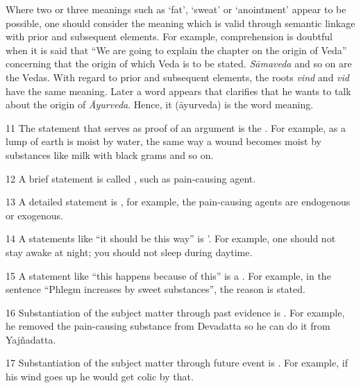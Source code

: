 \begin{translation}
   Where two or three meanings such as `fat’, `sweat’ or `anointment’ appear to be possible, one should consider the meaning which is valid through semantic linkage with prior and subsequent elements. For example, comprehension is doubtful when it is said that “We are going to explain the chapter on the origin of Veda” concerning that the origin of which Veda is to be stated. \emph{Sāmaveda} and so on are the Vedas. With regard to prior and subsequent elements, the roots \emph{vind} and \emph{vid} have the same meaning. Later a word appears that clarifies that he wants to talk about the origin of \emph{Āyurveda}. Hence, it (āyurveda) is the word meaning.  
    
    \item [11] The statement that serves as proof of an argument is the . For example, as a lump of earth is moist by water, the same way a wound becomes moist by substances like milk with black grams and so on.  
    
    \item [12] A brief statement is called , such as  {pain-causing agent}. 
    
    \item [13] A detailed statement is , for example, the pain-causing agents are endogenous or exogenous. 
    
    \item [14] A statements like ``it should be this way'' is '. For example, one should not stay awake at night; you should not sleep during daytime.  
    
    \item [15] A statement like “this happens because of this” is a . For example, in the sentence “Phlegm increases by sweet substances”, the reason is stated.  
    
    \item [16] Substantiation of the subject matter through past evidence is . For example, he removed the pain-causing substance from Devadatta so he can do it from Yajñadatta. 
    
    \item [17] Substantiation of the subject matter through future event is . For example, if his wind goes up he would get colic by that.  
    
    
    
\end{translation}

